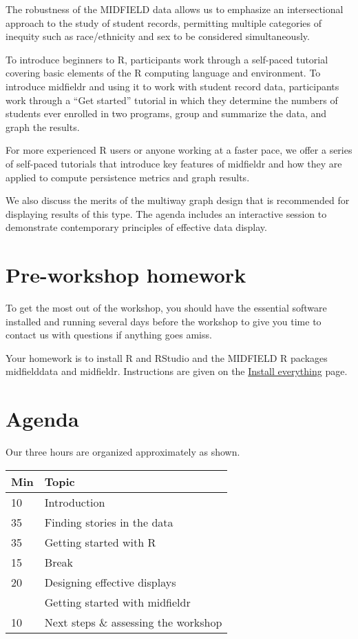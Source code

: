 \documentclass[
]{book}
\begin{document}
The robustness of the MIDFIELD data allows us to emphasize an intersectional approach to the study of student records, permitting multiple categories of inequity such as race/ethnicity and sex to be considered simultaneously.

To introduce beginners to R, participants work through a self-paced tutorial covering basic elements of the R computing language and environment. To introduce midfieldr and using it to work with student record data, participants work through a ``Get started'' tutorial in which they determine the numbers of students ever enrolled in two programs, group and summarize the data, and graph the results.

For more experienced R users or anyone working at a faster pace, we offer a series of self-paced tutorials that introduce key features of midfieldr and how they are applied to compute persistence metrics and graph results.

We also discuss the merits of the multiway graph design that is recommended for displaying results of this type. The agenda includes an interactive session to demonstrate contemporary principles of effective data display.

\hypertarget{pre-workshop-homework}{%
\section*{Pre-workshop homework}\label{pre-workshop-homework}}

To get the most out of the workshop, you should have the essential software installed and running several days before the workshop to give you time to contact us with questions if anything goes amiss.

Your homework is to install R and RStudio and the MIDFIELD R packages midfielddata and midfieldr. Instructions are given on the \protect\hyperlink{install-everything}{Install everything} page.

\hypertarget{agenda}{%
\section*{Agenda}\label{agenda}}

Our three hours are organized approximately as shown.

\begin{tabular}{ll}
\toprule
Min & Topic\\
\midrule
10 & Introduction\\
35 & Finding stories in the data\\
35 & Getting started with R\\
15 & Break\\
20 & Designing effective displays\\
\addlinespace
55 & Getting started with midfieldr\\
10 & Next steps \& assessing the workshop\\
\bottomrule
\end{tabular}
\end{document}
